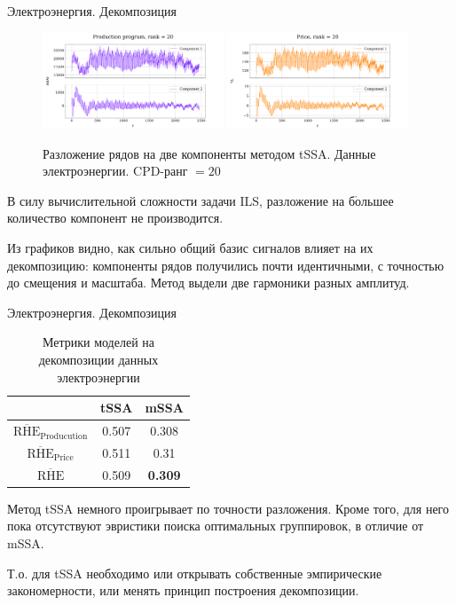 	\begin{frame}{Электроэнергия. Декомпозиция}
		
		\begin{figure}[h]
			\centering
			\includegraphics[width=0.48\textwidth, keepaspectratio]{../../experiments/electricity/tssa/figs/decomposition/cpd_rank_20/Production_program.png}
			\includegraphics[width=0.48\textwidth, keepaspectratio]{../../experiments/electricity/tssa/figs/decomposition/cpd_rank_20/Price.png}
			\caption{Разложение рядов на две компоненты методом tSSA. Данные электроэнергии. CPD-ранг $ = 20 $}
		\end{figure} 
		
		В силу вычислительной сложности задачи ILS, разложение на б$\acute{\text{о}}$льшее количество компонент не производится. 
		
		Из графиков видно, как сильно общий базис сигналов влияет на их декомпозицию: компоненты рядов получились почти идентичными, с точностью до смещения и масштаба. Метод выдели две гармоники разных амплитуд.
		
	\end{frame}
	
	\begin{frame}{Электроэнергия. Декомпозиция}
		
		\def\arraystretch{1.1}
		\begin{table}[h]
			\centering
			\caption{Метрики моделей на декомпозиции данных электроэнергии}
			\begin{tabular}{|c|c|c|}
				\hline
				& tSSA  & mSSA           \\ \hline
				$ \overline{\text{RHE}}_{\text{Producution}} $  & 0.507 & 0.308          \\ \hline
				$ \overline{\text{RHE}}_{\text{Price}} $      & 0.511 & 0.31           \\ \hline
				$ \overline{\text{RHE}} $             & 0.509 & \textbf{0.309} \\ \hline
			\end{tabular}
		\end{table}
		
		Метод tSSA немного проигрывает по точности разложения. Кроме того, для него пока отсутствуют эвристики поиска оптимальных группировок, в отличие от mSSA. 
		
		Т.о. для tSSA необходимо или открывать собственные эмпирические закономерности, или менять принцип построения декомпозиции.
		
	\end{frame}
	
